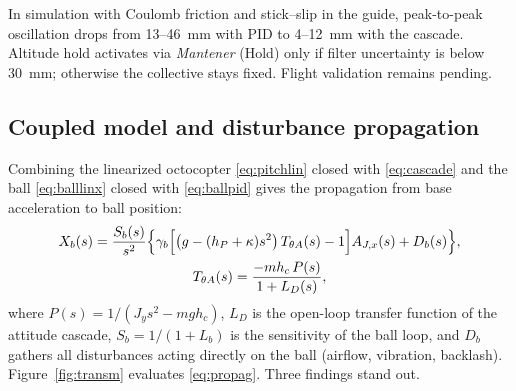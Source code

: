 In simulation with Coulomb friction and stick--slip in the guide, peak-to-peak oscillation drops from 13--\SI{46}{\milli\metre} with PID to 4--\SI{12}{\milli\metre} with the cascade. Altitude hold activates via \emph{Mantener} (Hold) only if filter uncertainty is below \SI{30}{\milli\metre}; otherwise the collective stays fixed. Flight validation remains pending.

\subsection{Coupled model and disturbance propagation}
\label{sec:coupling}

Combining the linearized octocopter \eqref{eq:pitchlin} closed with \eqref{eq:cascade} and the ball \eqref{eq:balllinx} closed with \eqref{eq:ballpid} gives the propagation from base acceleration to ball position:
\begin{gather}
  X_b(s)=\frac{S_b(s)}{s^2}\Big\{\gamma_b\Big[\big(g-(h_P+\kappa)s^2\big)\,T_{\theta A}(s)-1\Big]A_{J,x}(s)+D_b(s)\Big\}, \label{eq:propag}\\
  T_{\theta A}(s)=\frac{-m h_c\,P(s)}{1+L_D(s)}, \notag
\end{gather}
where $P(s)=1/(J_ys^2-mgh_c)$, $L_D$ is the open-loop transfer function of the attitude cascade, $S_b=1/(1+L_b)$ is the sensitivity of the ball loop, and $D_b$ gathers all disturbances acting directly on the ball (airflow, vibration, backlash). Figure~\ref{fig:transm} evaluates \eqref{eq:propag}. Three findings stand out.

